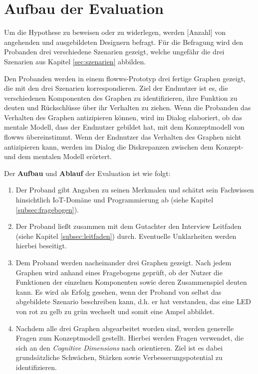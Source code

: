 \section{Aufbau der Evaluation}
Um die Hypothese zu beweisen oder zu widerlegen, werden [Anzahl] von angehenden und ausgebildeten Designern befragt. Für die Befragung wird den Probanden drei verschiedene Szenarien gezeigt, welche ungefähr die drei Szenarien aus Kapitel \ref{sec:szenarien} abbilden.

Den Probanden werden in einem flowws-Prototyp drei fertige Graphen gezeigt, die mit den drei Szenarien korrespondieren. Ziel der Endnutzer ist es, die verschiedenen Komponenten des Graphen zu identifizieren, ihre Funktion zu deuten und Rückschlüsse über ihr Verhalten zu ziehen. Wenn die Probanden das Verhalten des Graphen antizipieren können, wird im Dialog elaboriert, ob das mentale Modell, dass der Endnutzer gebildet hat, mit dem Konzeptmodell von flowws übereinstimmt. Wenn der Endnutzer das Verhalten des Graphen nicht antizipieren kann, werden im Dialog die Diskrepanzen zwischen dem Konzept- und dem mentalen Modell erörtert.

Der \textbf{Aufbau} und \textbf{Ablauf} der Evaluation ist wie folgt:
\begin{enumerate}
    \item Der Proband gibt Angaben zu seinen Merkmalen und schätzt sein Fachwissen hinsichtlich \ac{IoT}-Domäne und Programmierung ab (siehe Kapitel \ref{subsec:fragebogen}).
    \item Der Proband ließt zusammen mit dem Gutachter den Interview Leitfaden (siehe Kapitel \ref{subsec:leitfaden}) durch. Eventuelle Unklarheiten werden hierbei beseitigt. 
    \item Dem Proband werden nacheinander drei Graphen gezeigt. Nach jedem Graphen wird anhand eines Fragebogens geprüft, ob der Nutzer die Funktionen der einzelnen Komponenten sowie deren Zusammenspiel deuten kann. Es wird als Erfolg gesehen, wenn der Proband von selbst das abgebildete Szenario beschreiben kann, d.h. er hat verstanden, das eine LED von rot zu gelb zu grün wechselt und somit eine Ampel abbildet. 
    \item Nachdem alle drei Graphen abgearbeitet worden sind, werden generelle Fragen zum Konzeptmodell gestellt. Hierbei werden Fragen verwendet, die sich an den \textit{Cognitive Dimensions} nach \cite{blackwell2000cognitive} orientieren. Ziel ist es dabei grundsätzliche Schwächen, Stärken sowie Verbesserungspotential zu identifizieren.
\end{enumerate}

